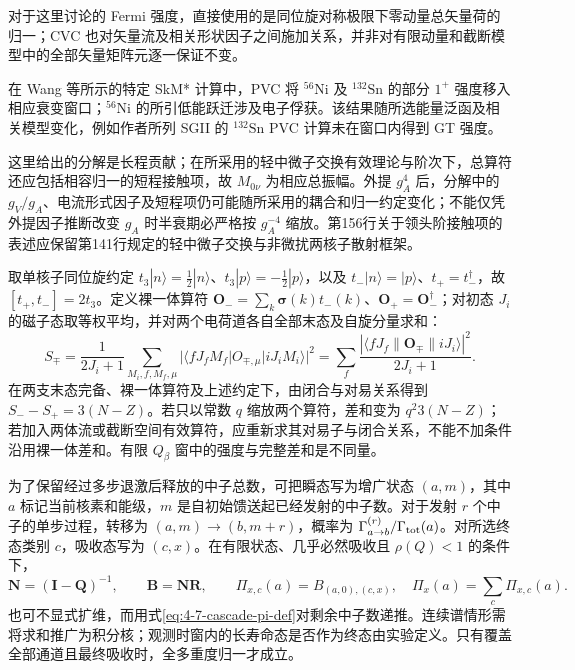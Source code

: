 对于这里讨论的 Fermi 强度，直接使用的是同位旋对称极限下零动量总矢量荷的归一；CVC 也对矢量流及相关形状因子之间施加关系，并非对有限动量和截断模型中的全部矢量矩阵元逐一保证不变。

在 Wang 等所示的特定 SkM* 计算中，PVC 将 $^{56}\mathrm{Ni}$ 及 $^{132}\mathrm{Sn}$ 的部分 $1^+$ 强度移入相应衰变窗口；$^{56}\mathrm{Ni}$ 的所引低能跃迁涉及电子俘获。该结果随所选能量泛函及相关模型变化，例如作者所列 SGII 的 $^{132}\mathrm{Sn}$ PVC 计算未在窗口内得到 GT 强度。

这里给出的分解是长程贡献；在所采用的轻中微子交换有效理论与阶次下，总算符还应包括相容归一的短程接触项，故 $M_{0\nu}$ 为相应总振幅。外提 $g_A^4$ 后，分解中的 $g_V/g_A$、电流形式因子及短程项仍可能随所采用的耦合和归一约定变化；不能仅凭外提因子推断改变 $g_A$ 时半衰期必严格按 $g_A^{-4}$ 缩放。第156行关于领头阶接触项的表述应保留第141行规定的轻中微子交换与非微扰两核子散射框架。

取单核子同位旋约定 $t_3|n\rangle=\frac12|n\rangle$、$t_3|p\rangle=-\frac12|p\rangle$，以及 $t_-|n\rangle=|p\rangle$、$t_+=t_-^\dagger$，故 $[t_+,t_-]=2t_3$。定义裸一体算符 $\mathbf O_-=\sum_k\boldsymbol\sigma(k)t_-(k)$、$\mathbf O_+=\mathbf O_-^\dagger$；对初态 $J_i$ 的磁子态取等权平均，并对两个电荷道各自全部末态及自旋分量求和：
\[
S_\mp=\frac{1}{2J_i+1}\sum_{M_i,f,M_f,\mu}
|\langle fJ_fM_f|O_{\mp,\mu}|iJ_iM_i\rangle|^2
=\sum_f\frac{|\langle fJ_f\|\mathbf O_\mp\|iJ_i\rangle|^2}{2J_i+1}.
\]
在两支末态完备、裸一体算符及上述约定下，由闭合与对易关系得到 $S_--S_+=3(N-Z)$。若只以常数 $q$ 缩放两个算符，差和变为 $q^2 3(N-Z)$；若加入两体流或截断空间有效算符，应重新求其对易子与闭合关系，不能不加条件沿用裸一体差和。有限 $Q_\beta$ 窗中的强度与完整差和是不同量。


为了保留经过多步退激后释放的中子总数，可把瞬态写为增广状态 $(a,m)$，其中 $a$ 标记当前核素和能级，$m$ 是自初始馈送起已经发射的中子数。对于发射 $r$ 个中子的单步过程，转移为 $(a,m)\to(b,m+r)$，概率为 $\Gamma_{a\to b}^{(r)}/\Gamma_{\rm tot}(a)$。对所选终态类别 $c$，吸收态写为 $(c,x)$。在有限状态、几乎必然吸收且 $\rho(Q)<1$ 的条件下，
\[
\mathbf N=(\mathbf I-\mathbf Q)^{-1},\qquad
\mathbf B=\mathbf N\mathbf R,\qquad
\Pi_{x,c}(a)=B_{(a,0),(c,x)},\quad
\Pi_x(a)=\sum_c\Pi_{x,c}(a).
\]
也可不显式扩维，而用式\eqref{eq:4-7-cascade-pi-def}对剩余中子数递推。连续谱情形需将求和推广为积分核；观测时窗内的长寿命态是否作为终态由实验定义。只有覆盖全部通道且最终吸收时，全多重度归一才成立。

